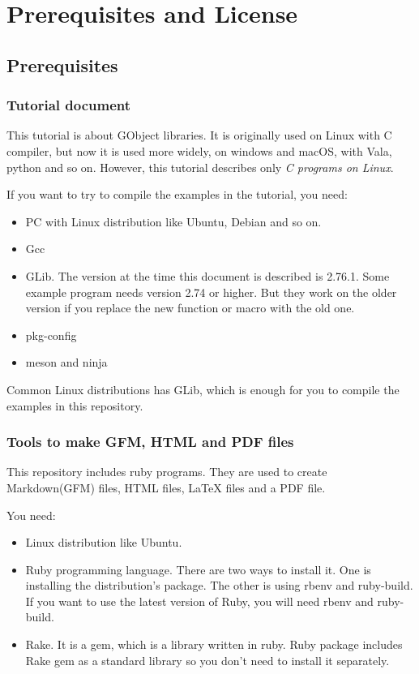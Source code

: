 \section{Prerequisites and License}\label{prerequisites-and-license}

\subsection{Prerequisites}\label{prerequisites}

\subsubsection{Tutorial document}\label{tutorial-document}

This tutorial is about GObject libraries. It is originally used on Linux
with C compiler, but now it is used more widely, on windows and macOS,
with Vala, python and so on. However, this tutorial describes only
\emph{C programs on Linux}.

If you want to try to compile the examples in the tutorial, you need:

\begin{itemize}
\tightlist
\item
  PC with Linux distribution like Ubuntu, Debian and so on.
\item
  Gcc
\item
  GLib. The version at the time this document is described is 2.76.1.
  Some example program needs version 2.74 or higher. But they work on
  the older version if you replace the new function or macro with the
  old one.
\item
  pkg-config
\item
  meson and ninja
\end{itemize}

Common Linux distributions has GLib, which is enough for you to compile
the examples in this repository.

\subsubsection{Tools to make GFM, HTML and PDF
files}\label{tools-to-make-gfm-html-and-pdf-files}

This repository includes ruby programs. They are used to create
Markdown(GFM) files, HTML files, LaTeX files and a PDF file.

You need:

\begin{itemize}
\tightlist
\item
  Linux distribution like Ubuntu.
\item
  Ruby programming language. There are two ways to install it. One is
  installing the distribution's package. The other is using rbenv and
  ruby-build. If you want to use the latest version of Ruby, you will
  need rbenv and ruby-build.
\item
  Rake. It is a gem, which is a library written in ruby. Ruby package
  includes Rake gem as a standard library so you don't need to install
  it separately.
\end{itemize}

